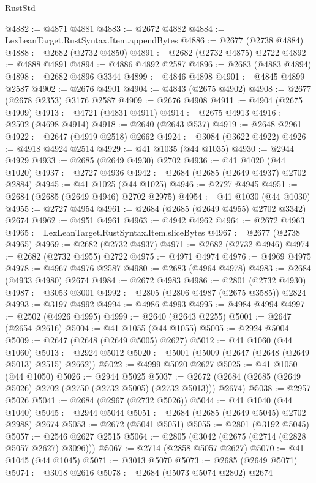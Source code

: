 \begin{lexlean}{RustStd}
\begin{coremodule}
{\begin{coremodule}
{{{{{{{{{{{{{{{{{{{{{{{{{{@4882 := @4871 @4881
@4883 := @2672 @4882
@4884 := LexLeanTarget.RustSyntax.Item.appendBytes
@4886 := @2677 (@2738 @4884)
@4888 := @2682 (@2732 @4850)
@4891 := @2682 (@2732 @4875) @2722
@4892 := @4888 @4891
@4894 := @4886 @4892 @2587
@4896 := @2683 (@4883 @4894)
@4898 := @2682 @4896 @3344
@4899 := @4846 @4898
@4901 := @4845 @4899 @2587
@4902 := @2676 @4901
@4904 := @4843 (@2675 @4902)
@4908 := @2677 (@2678 @2353) @3176 @2587
@4909 := @2676 @4908
@4911 := @4904 (@2675 @4909)
@4913 := @4721 (@4831 @4911)
@4914 := @2675 @4913
@4916 := @2502 (@4698 @4914)
@4918 := @2640 (@2643 @537)
@4919 := @2648 @2961
@4922 := @2647 (@4919 @2518) @2662
@4924 := @3084 (@3622 @4922)
@4926 := @4918 @4924 @2514
@4929 := @41 @1035 (@44 @1035)
@4930 := @2944 @4929
@4933 := @2685 (@2649 @4930) @2702
@4936 := @41 @1020 (@44 @1020)
@4937 := @2727 @4936
@4942 := @2684 (@2685 (@2649 @4937) @2702 @2884)
@4945 := @41 @1025 (@44 @1025)
@4946 := @2727 @4945
@4951 := @2684 (@2685 (@2649 @4946) @2702 @2975)
@4954 := @41 @1030 (@44 @1030)
@4955 := @2727 @4954
@4961 := @2684 (@2685 (@2649 @4955) @2702 @3342) @2674
@4962 := @4951 @4961
@4963 := @4942 @4962
@4964 := @2672 @4963
@4965 := LexLeanTarget.RustSyntax.Item.sliceBytes
@4967 := @2677 (@2738 @4965)
@4969 := @2682 (@2732 @4937)
@4971 := @2682 (@2732 @4946)
@4974 := @2682 (@2732 @4955) @2722
@4975 := @4971 @4974
@4976 := @4969 @4975
@4978 := @4967 @4976 @2587
@4980 := @2683 (@4964 @4978)
@4983 := @2684 (@4933 @4980) @2674
@4984 := @2672 @4983
@4986 := @2801 (@2732 @4930)
@4987 := @3053 @3001
@4992 := @2805 (@2806 @4987 (@2675 @3585)) @2824
@4993 := @3197 @4992
@4994 := @4986 @4993
@4995 := @4984 @4994
@4997 := @2502 (@4926 @4995)
@4999 := @2640 (@2643 @2255)
@5001 := @2647 (@2654 @2616)
@5004 := @41 @1055 (@44 @1055)
@5005 := @2924 @5004
@5009 := @2647 (@2648 (@2649 @5005) @2627)
@5012 := @41 @1060 (@44 @1060)
@5013 := @2924 @5012
@5020 := @5001 (@5009 (@2647 (@2648 (@2649 @5013) @2515) @2662))
@5022 := @4999 @5020 @2627
@5025 := @41 @1050 (@44 @1050)
@5026 := @2944 @5025
@5037 := @2672 (@2684 (@2685 (@2649 @5026) @2702 (@2750 (@2732 @5005) (@2732 @5013))) @2674)
@5038 := @2957 @5026
@5041 := @2684 (@2967 (@2732 @5026))
@5044 := @41 @1040 (@44 @1040)
@5045 := @2944 @5044
@5051 := @2684 (@2685 (@2649 @5045) @2702 @2988) @2674
@5053 := @2672 (@5041 @5051)
@5055 := @2801 (@3192 @5045)
@5057 := @2546 @2627 @2515
@5064 := @2805 (@3042 (@2675 (@2714 (@2828 @5057 @2627) @3096)))
@5067 := @2714 (@2858 @5057 @2627)
@5070 := @41 @1045 (@44 @1045)
@5071 := @3013 @5070
@5073 := @2685 (@2649 @5071)
@5074 := @3018 @2616
@5078 := @2684 (@5073 @5074 @2802) @2674
}}}}}}}}}}}}}}}}}}}}}}}}}}
\end{coremodule}}
\end{coremodule}
\end{lexlean}
